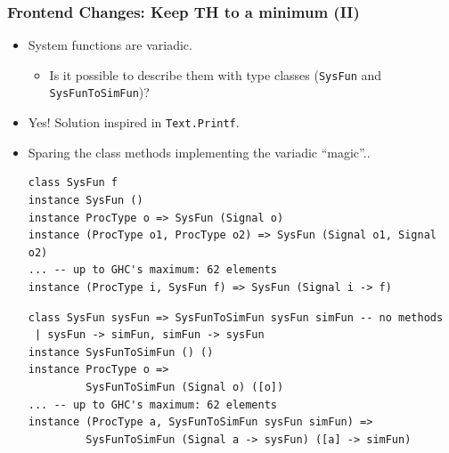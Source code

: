 \documentclass{beamer}
\begin{document}
\begin{frame}[fragile]
  \frametitle{Frontend Changes: Keep TH to a minimum (II)}
  \begin{itemize}
  \item<1-> System functions are variadic. 
    \begin{itemize}
    \item Is it possible to describe them with type classes
      (\texttt{SysFun} and \texttt{SysFunToSimFun})?
    \end{itemize}
  \item<2-> Yes! Solution inspired in \texttt{Text.Printf}.
  \item<3-> Sparing the class methods implementing the variadic ``magic''..
\begin{lstlisting}
class SysFun f 
instance SysFun ()
instance ProcType o => SysFun (Signal o)
instance (ProcType o1, ProcType o2) => SysFun (Signal o1, Signal o2)
... -- up to GHC's maximum: 62 elements
instance (ProcType i, SysFun f) => SysFun (Signal i -> f)
\end{lstlisting}
\begin{lstlisting}
class SysFun sysFun => SysFunToSimFun sysFun simFun -- no methods
 | sysFun -> simFun, simFun -> sysFun
instance SysFunToSimFun () ()
instance ProcType o => 
         SysFunToSimFun (Signal o) ([o])
... -- up to GHC's maximum: 62 elements
instance (ProcType a, SysFunToSimFun sysFun simFun) =>
         SysFunToSimFun (Signal a -> sysFun) ([a] -> simFun) 
\end{lstlisting}
\end{itemize}
\end{frame}
\end{document}
